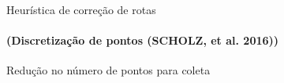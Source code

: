 \documentclass[12pt]{beamer}
\begin{document}
	\begin{frame}{Heur\'istica de corre\c{c}\~ao de rotas}
	\framesubtitle{(Discretiza\c{c}\~ao de pontos (SCHOLZ, et al. 2016))}
	\fboxsep=0pt
	Redu\c{c}\~ao no n\'umero de pontos para coleta
	\noindent{}
\end{frame}
\end{document}
